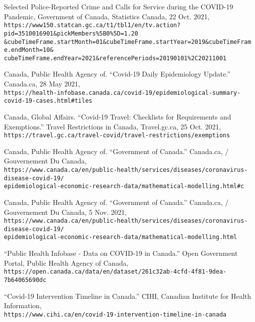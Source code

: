 \documentclass[fontsize=11pt]{article}
\newcommand{\quotes}[1]{``#1''}
\begin{document}
\begin{thebibliography}{9}
	Selected Police-Reported Crime and Calls for Service during the COVID-19 Pandemic, Government of Canada, Statistics Canada, 22 Oct. 2021, \\
	\verb+https://www150.statcan.gc.ca/t1/tbl1/en/tv.action?pid=3510016901&pickMembers%5B0%5D=1.20+\\
	\verb+&cubeTimeFrame.startMonth=01&cubeTimeFrame.startYear=2019&cubeTimeFrame.endMonth=10&+\\
	\verb+cubeTimeFrame.endYear=2021&referencePeriods=20190101%2C20211001+
	
	Canada, Public Health Agency of. \quotes{Covid-19 Daily Epidemiology Update.} Canada.ca, 28 May 2021,\\
	\verb+https://health-infobase.canada.ca/covid-19/epidemiological-summary-covid-19-cases.html#tiles+
	
	Canada, Global Affairs. \quotes{Covid-19 Travel: Checklists for Requirements and Exemptions.} Travel Restrictions in Canada,  Travel.gc.ca, 25 Oct. 2021,\\
	\verb+https://travel.gc.ca/travel-covid/travel-restrictions/exemptions+
	
	Canada, Public Health Agency of. \quotes{Government of Canada.} Canada.ca, / Gouvernement Du Canada,\\
	\verb+https://www.canada.ca/en/public-health/services/diseases/coronavirus-disease-covid-19/+\\
	\verb+epidemiological-economic-research-data/mathematical-modelling.html#c+
	
	Canada, Public Health Agency of. \quotes{Government of Canada.} Canada.ca, / Gouvernement Du Canada, 5 Nov. 2021,\\
	\verb+https://www.canada.ca/en/public-health/services/diseases/coronavirus-disease-covid-19/+\\
	\verb+epidemiological-economic-research-data/mathematical-modelling.html+
	
	\quotes{Public Health Infobase - Data on COVID-19 in Canada.} Open Government Portal, Public Health Agency of Canada,\\
	\verb+https://open.canada.ca/data/en/dataset/261c32ab-4cfd-4f81-9dea-7b64065690dc+
	
	\quotes{Covid-19 Intervention Timeline in Canada.} CIHI, Canadian Institute for Health Information,\\
	\verb+https://www.cihi.ca/en/covid-19-intervention-timeline-in-canada+
	
	
	
\end{thebibliography}
\end{document}
